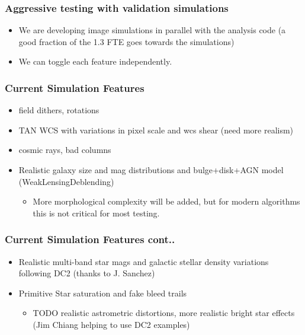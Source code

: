 \documentclass{beamer}
\begin{document}
\frame
{

    \frametitle{Aggressive testing with validation simulations}

    \begin{itemize}

        \item We are developing image simulations in parallel with the analysis
            code (a good fraction of the 1.3 FTE goes towards the simulations)

        \item We can toggle each feature independently.

    \end{itemize}

}

\frame
{

    \frametitle{Current Simulation Features}


    \begin{itemize}

                \item field dithers, rotations

                \item TAN WCS with variations in pixel scale and wcs shear (need more realism)

                \item cosmic rays, bad columns

                \item Realistic galaxy size and mag distributions and bulge+disk+AGN model
                  (WeakLensingDeblending)

                  \begin{itemize}

                        \item More morphological complexity will be added, but
                            for modern algorithms this is not critical for most
                            testing.

                  \end{itemize}

    \end{itemize}
}

\frame
{

    \frametitle{Current Simulation Features cont..}


    \begin{itemize}

        \item Realistic multi-band star mags and galactic stellar density variations
            following DC2 (thanks to J. Sanchez)

        \item Primitive Star saturation and fake bleed trails

        \begin{itemize}
            \item TODO realistic astrometric distortions, more realistic bright
                star effects (Jim Chiang helping to use DC2 examples)
        \end{itemize}

    \end{itemize}
}
\end{document}
